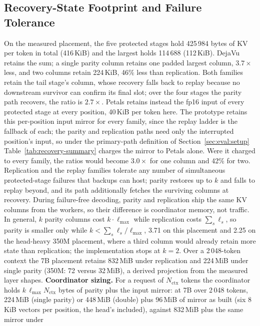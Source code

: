 \subsection{Recovery-State Footprint and Failure Tolerance}\label{sec:eval:footprint}

On the measured placement, the five protected stages hold 425\,984 bytes of
KV per token in total (416\,KiB) and the largest holds 114\,688 (112\,KiB).
DejaVu retains the sum; a single parity column retains one padded largest
column, $3.7\times$ less, and two columns retain 224\,KiB, 46\% less than
replication.  Both families retain the tail stage's column, whose recovery
falls back to replay because no downstream survivor can confirm its final
slot; over the four stages the
parity path recovers, the ratio is $2.7\times$.  Petals retains instead the
fp16 input of every protected stage at every position, 40\,KiB per token here.
The prototype retains this per-position input mirror for every family,
since the replay ladder is the fallback of each; the parity and replication
paths need only the interrupted position's input, so under the
primary-path definition of Section~\ref{sec:eval:setup}
Table~\ref{tab:recovery-summary} charges the mirror to Petals alone.  Were
it charged to every family, the ratios would become $3.0\times$ for one
column and 42\% for two.
Replication and the replay families tolerate any number of simultaneous
protected-stage failures that backups can host; parity restores up to $k$ and falls to replay beyond, and its path
additionally fetches the surviving columns at recovery.
During failure-free decoding, parity and replication ship the same KV
columns from the workers, so their difference is coordinator memory, not
traffic.  In general, $k$ parity
columns cost $k\cdot\ell_{\max}$ while replication costs $\sum_s\ell_s$, so
parity is smaller only while $k<\sum_s\ell_s/\ell_{\max}$, 3.71 on this
placement and 2.25 on the head-heavy 350M placement, where a third column
would already retain more state than replication; the implementation stops
at $k=2$.  Over a 2\,048-token context the 7B placement retains 832\,MiB
under replication and 224\,MiB under single parity (350M: 72 versus 32\,MiB),
a derived projection from the measured layer shapes.  \textbf{Coordinator sizing.}  For a request of $N_{\mathrm{ctx}}$ tokens
the coordinator holds $k\,\ell_{\max}N_{\mathrm{ctx}}$ bytes of parity plus
the input mirror: at 7B over 2\,048 tokens, 224\,MiB (single parity) or
448\,MiB (double) plus 96\,MiB of mirror as built (six 8\,KiB vectors per
position, the head's included), against 832\,MiB plus the same mirror under
